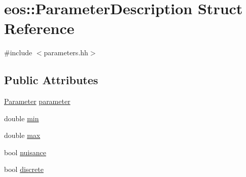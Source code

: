\hypertarget{structeos_1_1ParameterDescription}{
\section{eos::ParameterDescription Struct Reference}
\label{structeos_1_1ParameterDescription}
}


{\ttfamily \#include $<$parameters.hh$>$}\subsection*{Public Attributes}
\begin{DoxyCompactItemize}
\item 
\hyperlink{classeos_1_1Parameter}{Parameter} \hyperlink{structeos_1_1ParameterDescription_a2d531fff965fd9c1c833213a229c5f10}{parameter}
\item 
double \hyperlink{structeos_1_1ParameterDescription_abab49c1ed74185718b6d696938d94683}{min}
\item 
double \hyperlink{structeos_1_1ParameterDescription_a4375b5ec8b9d496a6183d08f92dc648b}{max}
\item 
bool \hyperlink{structeos_1_1ParameterDescription_ac9e90def0fd26f7f4f9f59df93f64401}{nuisance}
\item 
bool \hyperlink{structeos_1_1ParameterDescription_a3f62f41ab537a373291807e3b2445c08}{discrete}
\end{DoxyCompactItemize}


